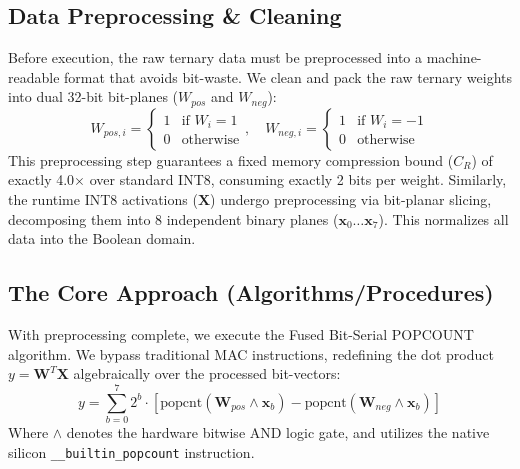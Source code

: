 \documentclass[10pt, conference]{IEEEtran}
\begin{document}
\subsection{Data Preprocessing \& Cleaning}
Before execution, the raw ternary data must be preprocessed into a machine-readable format that avoids bit-waste. We clean and pack the raw ternary weights into dual 32-bit bit-planes ($W_{pos}$ and $W_{neg}$):
\begin{equation}
W_{pos, i} = \begin{cases} 1 & \text{if } W_i = 1 \\ 0 & \text{otherwise} \end{cases}, \quad W_{neg, i} = \begin{cases} 1 & \text{if } W_i = -1 \\ 0 & \text{otherwise} \end{cases}
\end{equation}
This preprocessing step guarantees a fixed memory compression bound ($C_R$) of exactly 4.0$\times$ over standard INT8, consuming exactly 2 bits per weight.
Similarly, the runtime INT8 activations ($\mathbf{X}$) undergo preprocessing via bit-planar slicing, decomposing them into 8 independent binary planes ($\mathbf{x}_0 \dots \mathbf{x}_7$). This normalizes all data into the Boolean domain.

\subsection{The Core Approach (Algorithms/Procedures)}
With preprocessing complete, we execute the Fused Bit-Serial POPCOUNT algorithm. We bypass traditional MAC instructions, redefining the dot product $y = \mathbf{W}^T \mathbf{X}$ algebraically over the processed bit-vectors:
\begin{equation}
\label{eq:fused_math}
y = \sum_{b=0}^{7} 2^b \cdot \left[ \text{popcnt}(\mathbf{W}_{pos} \wedge \mathbf{x}_b) - \text{popcnt}(\mathbf{W}_{neg} \wedge \mathbf{x}_b) \right]
\end{equation}
Where $\wedge$ denotes the hardware bitwise AND logic gate, and  utilizes the native silicon \texttt{\_\_builtin\_popcount} instruction.
\end{document}
